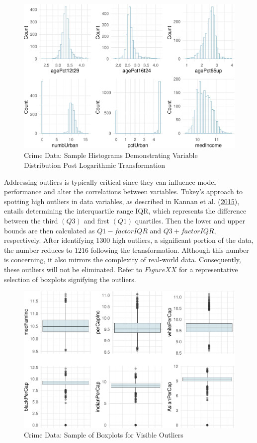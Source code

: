 \documentclass[
  11pt,
]{article}
\begin{document}
\begin{figure}[H]

{\centering \includegraphics[width=0.85\linewidth]{dissertation_files/figure-latex/Histograms df_t Plot-1} 

}

\caption{Crime Data: Sample Histograms Demonstrating Variable Distribution Post Logarithmic Transformation}\label{fig:Histograms df_t Plot}
\end{figure}

Addressing outliers is typically critical since they can influence model
performance and alter the correlations between variables. Tukey's
approach to spotting high outliers in data variables, as described in
Kannan et al. (\protect\hyperlink{ref-Kannan2015}{2015}), entails
determining the interquartile range IQR, which represents the difference
between the third \((Q3)\) and first \((Q1)\) quartiles. Then the lower
and upper bounds are then calculated as \(Q1 - factorIQR\) and
\(Q3 + factorIQR\), respectively. After identifying \(1300\) high
outliers, a significant portion of the data, the number reduces to
\(1216\) following the transformation. Although this number is
concerning, it also mirrors the complexity of real-world data.
Consequently, these outliers will not be eliminated. Refer to
\(Figure XX\) for a representative selection of boxplots signifying the
outliers.

\begin{figure}[H]

{\centering \includegraphics[width=0.75\linewidth]{dissertation_files/figure-latex/Box Plot-1} 

}

\caption{Crime Data: Sample of Boxplots for Visible Outliers}\label{fig:Box Plot}
\end{figure}
\end{document}
